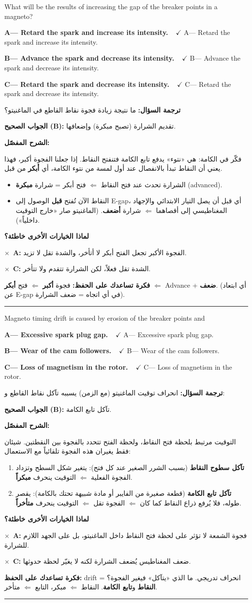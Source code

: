 \documentclass[11pt,a4paper]{article}
\newcommand{\en}[1]{\textenglish{#1}}
\newcommand{\correctletter}{}
\newcommand{\opt}[2]{%
  \ifdefstring{\correctletter}{#1}%
    {\textcolor{ansgreen}{\textbf{#1— #2\ \ $\checkmark$}}}%
    {#1— #2}\par}
\newcommand{\Q}[6]{%
  \renewcommand{\correctletter}{#6}%
  \par\bigskip
  \phantomsection\label{q#1}%
  \begin{tcolorbox}[enhanced,breakable,colback=qback,colframe=qframe,
      arc=2mm,boxrule=0.8pt,fonttitle=\bfseries,
      title={\en{Question #1}}]
    \begin{english}
      #2\par\smallskip
      \opt{A}{#3}\opt{B}{#4}\opt{C}{#5}
    \end{english}
  \end{tcolorbox}}
\newcommand{\tr}[1]{\textbf{\textcolor{qframe}{ترجمة السؤال:}} #1\par}
\newcommand{\ans}[2]{%
  \begin{tcolorbox}[colback=ansback,colframe=ansgreen,boxrule=0.6pt,arc=1.5mm,
      left=4pt,right=4pt,top=2pt,bottom=2pt]
    \textbf{\textcolor{ansgreen}{الجواب الصحيح (\en{#1}):}} #2
  \end{tcolorbox}}
\newcommand{\sharh}[1]{\textbf{\textcolor{conceptc}{الشرح المفصّل:}}\par #1\par}
\newcommand{\nohead}{\textbf{\textcolor{wrongc}{لماذا الخيارات الأخرى خاطئة؟}}\par}
\newcommand{\no}[2]{\hspace*{1em}\textcolor{wrongc}{$\times$}\ \textbf{\en{#1}:} #2\par}
\newcommand{\tip}[1]{%
  \begin{tcolorbox}[colback=tipback,colframe=tipframe,boxrule=0.5pt,arc=1.5mm,
      left=4pt,right=4pt,top=2pt,bottom=2pt]
    \textbf{فكرة تساعدك على الحفظ:} #1
  \end{tcolorbox}}
\newcommand{\qsep}{\par\medskip\noindent\textcolor{qframe!40}{\rule{\linewidth}{0.4pt}}\par}
\begin{document}
\Q{8509}{What will be the results of increasing the gap of the breaker points in a magneto?}
{Retard the spark and increase its intensity.}
{Advance the spark and decrease its intensity.}
{Retard the spark and decrease its intensity.}{B}
\tr{ما نتيجة زيادة فجوة نقاط القاطع في الماغنيتو؟}
\ans{B}{تقديم الشرارة (تصبح مبكرة) وإضعافها.}
\sharh{فكّر في الكامة: هي «نتوء» يدفع تابع الكامة فتنفتح النقاط. إذا جعلنا الفجوة أكبر، فهذا يعني أن النقاط تبدأ بالانفصال عند أول لمسة من نتوء الكامة، أي \textbf{أبكر} من قبل.
\begin{itemize}
  \item الشرارة تحدث عند فتح النقاط $\Leftarrow$ فتح أبكر = شرارة \textbf{مبكرة} (\en{advanced}).
  \item النقاط الآن تُفتح \textbf{قبل} الوصول إلى \en{E-gap}، أي قبل أن يصل التيار الابتدائي والإجهاد المغناطيسي إلى أقصاهما $\Leftarrow$ شرارة \textbf{أضعف}. (الماغنيتو صار «خارج التوقيت داخلياً»).
\end{itemize}}
\nohead
\no{A}{الفجوة الأكبر تجعل الفتح أبكر لا أتأخر، والشدة تقل لا تزيد.}
\no{C}{الشدة تقل فعلاً، لكن الشرارة تتقدم ولا تتأخر.}
\tip{فجوة \textbf{أكبر} $\Leftarrow$ فتح \textbf{أبكر} $\Leftarrow$ \en{Advance} + \textbf{ضعف}. (أي ابتعاد عن \en{E-gap} في أي اتجاه = ضعف الشرارة).}
\qsep

\Q{8512-2}{Magneto timing drift is caused by erosion of the breaker points and}
{Excessive spark plug gap.}
{Wear of the cam followers.}
{Loss of magnetism in the rotor.}{B}
\tr{انحراف توقيت الماغنيتو (مع الزمن) يسببه تآكل نقاط القاطع و:}
\ans{B}{تآكل تابع الكامة.}
\sharh{التوقيت مرتبط بلحظة فتح النقاط، ولحظة الفتح تتحدد بالفجوة بين النقطتين. شيئان فقط يغيران هذه الفجوة تلقائياً مع الاستعمال:
\begin{enumerate}[label=\arabic*.]
  \item \textbf{تآكل سطوح النقاط} (بسبب الشرر الصغير عند كل فتح): يتغير شكل السطح وتزداد الفجوة الفعلية $\Leftarrow$ التوقيت ينحرف \textbf{مبكراً}.
  \item \textbf{تآكل تابع الكامة} (قطعة صغيرة من الفايبر أو مادة شبيهة تحتك بالكامة): يقصر طوله، فلا يُرفع ذراع النقاط كما كان $\Leftarrow$ الفجوة تقل $\Leftarrow$ التوقيت ينحرف \textbf{متأخراً}.
\end{enumerate}}
\nohead
\no{A}{فجوة الشمعة لا تؤثر على لحظة فتح النقاط داخل الماغنيتو، بل على الجهد اللازم للشرارة.}
\no{C}{ضعف المغناطيس يُضعف الشرارة لكنه لا يغيّر لحظة حدوثها.}
\tip{\en{drift} = انحراف تدريجي. ما الذي «يتآكل» فيغير الفجوة؟ \textbf{النقاط} و\textbf{تابع الكامة}. النقاط $\Leftarrow$ مبكر، التابع $\Leftarrow$ متأخر.}
\qsep
\end{document}
